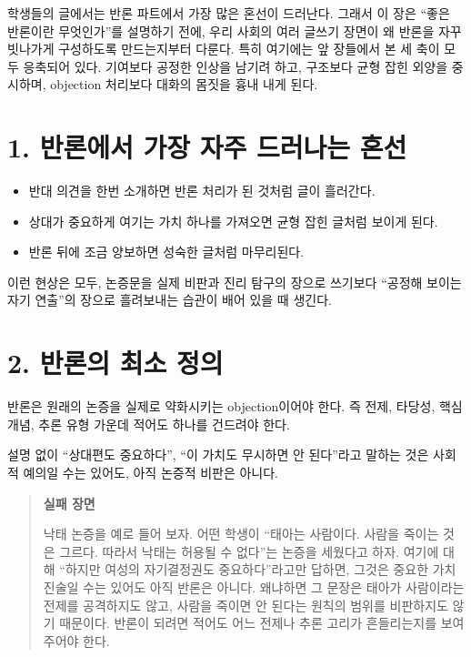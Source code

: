 학생들의 글에서는 반론 파트에서 가장 많은 혼선이 드러난다. 그래서 이 장은 ``좋은 반론이란 무엇인가''를 설명하기 전에, 우리 사회의 여러 글쓰기 장면이 왜 반론을 자꾸 빗나가게 구성하도록 만드는지부터 다룬다. 특히 여기에는 앞 장들에서 본 세 축이 모두 응축되어 있다. 기여보다 공정한 인상을 남기려 하고, 구조보다 균형 잡힌 외양을 중시하며, objection 처리보다 대화의 몸짓을 흉내 내게 된다.

\section{1. 반론에서 가장 자주 드러나는 혼선}\label{1-uxbc18uxb860uxc5d0uxc11c-uxac00uxc7a5-uxc790uxc8fc-uxb4dcuxb7ecuxb098uxb294-uxd63cuxc120}

\begin{itemize}
\tightlist
\item
  반대 의견을 한번 소개하면 반론 처리가 된 것처럼 글이 흘러간다.
\item
  상대가 중요하게 여기는 가치 하나를 가져오면 균형 잡힌 글처럼 보이게 된다.
\item
  반론 뒤에 조금 양보하면 성숙한 글처럼 마무리된다.
\end{itemize}

이런 현상은 모두, 논증문을 실제 비판과 진리 탐구의 장으로 쓰기보다 ``공정해 보이는 자기 연출''의 장으로 흘려보내는 습관이 배어 있을 때 생긴다.

\section{2. 반론의 최소 정의}\label{2-uxbc18uxb860uxc758-uxcd5cuxc18c-uxc815uxc758}

반론은 원래의 논증을 실제로 약화시키는 objection이어야 한다. 즉 전제, 타당성, 핵심 개념, 추론 유형 가운데 적어도 하나를 건드려야 한다.

설명 없이 ``상대편도 중요하다'', ``이 가치도 무시하면 안 된다''라고 말하는 것은 사회적 예의일 수는 있어도, 아직 논증적 비판은 아니다.

\begin{quote}
\textbf{실패 장면}

낙태 논증을 예로 들어 보자. 어떤 학생이 ``태아는 사람이다. 사람을 죽이는 것은 그르다. 따라서 낙태는 허용될 수 없다''는 논증을 세웠다고 하자. 여기에 대해 ``하지만 여성의 자기결정권도 중요하다''라고만 답하면, 그것은 중요한 가치 진술일 수는 있어도 아직 반론은 아니다. 왜냐하면 그 문장은 태아가 사람이라는 전제를 공격하지도 않고, 사람을 죽이면 안 된다는 원칙의 범위를 비판하지도 않기 때문이다. 반론이 되려면 적어도 어느 전제나 추론 고리가 흔들리는지를 보여 주어야 한다.
\end{quote}

